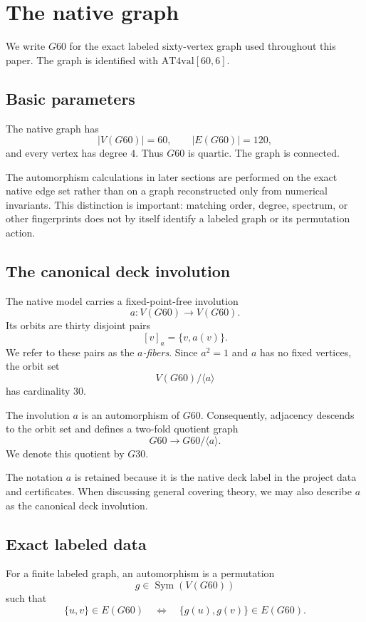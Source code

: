 \section{The native graph}
\label{sec:native-graph}

We write $G60$ for the exact labeled sixty-vertex graph used throughout
this paper. The graph is identified with $\mathrm{AT4val}[60,6]$.

\subsection{Basic parameters}

The native graph has
\[
|V(G60)|=60,
\qquad
|E(G60)|=120,
\]
and every vertex has degree $4$. Thus $G60$ is quartic. The graph is
connected.

The automorphism calculations in later sections are performed on the
exact native edge set rather than on a graph reconstructed only from
numerical invariants. This distinction is important: matching order,
degree, spectrum, or other fingerprints does not by itself identify a
labeled graph or its permutation action.

\subsection{The canonical deck involution}

The native model carries a fixed-point-free involution
\[
a\colon V(G60)\longrightarrow V(G60).
\]
Its orbits are thirty disjoint pairs
\[
[v]_a=\{v,a(v)\}.
\]
We refer to these pairs as the \emph{$a$-fibers}. Since $a^2=1$ and
$a$ has no fixed vertices, the orbit set
\[
V(G60)/\langle a\rangle
\]
has cardinality $30$.

The involution $a$ is an automorphism of $G60$. Consequently, adjacency
descends to the orbit set and defines a two-fold quotient graph
\[
G60\longrightarrow G60/\langle a\rangle.
\]
We denote this quotient by $G30$.

The notation $a$ is retained because it is the native deck label in the
project data and certificates. When discussing general covering theory,
we may also describe $a$ as the canonical deck involution.

\subsection{Exact labeled data}

For a finite labeled graph, an automorphism is a permutation
\[
g\in\operatorname{Sym}(V(G60))
\]
such that
\[
\{u,v\}\in E(G60)
\quad\Longleftrightarrow\quad
\{g(u),g(v)\}\in E(G60).
\]

